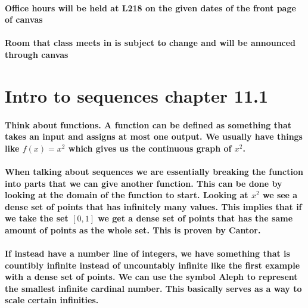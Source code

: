 \paragraph{Office hours will be held at L218 on the given dates of the front page of canvas}%
\label{par:Office hours will be held at L218 on the given dates of the front page of canvas}
\paragraph{Room that class meets in is subject to change and will be announced through canvas }%
\label{par:Room that class meets in is subject to change and will be announced through canvas }

\section{Intro to sequences chapter 11.1}%
\label{sec:Intro to sequences}

\paragraph{Think about functions. A function can be defined as something that takes an input and assigns at most one output. We usually have things like $f\left( x \right) = x^2$ which gives us the continuous graph of $x^2$. }

\paragraph{When talking about sequences we are essentially breaking the function into parts that we can give another function. This can be done by looking at the domain of the function to start. Looking at $x^2$ we see a dense set of points that has infinitely many values. This implies that if we take the set $\left[ 0,1 \right] $ we get a dense set of points that has the same amount of points as the whole set. This is proven by Cantor. }

\paragraph{If instead have a number line of integers, we have something that is countibly infinite instead of uncountably infinite like the first example with a dense set of points. We can use the symbol Aleph to represent the smallest infinite cardinal number. This basically serves as a way to scale certain infinities.}

